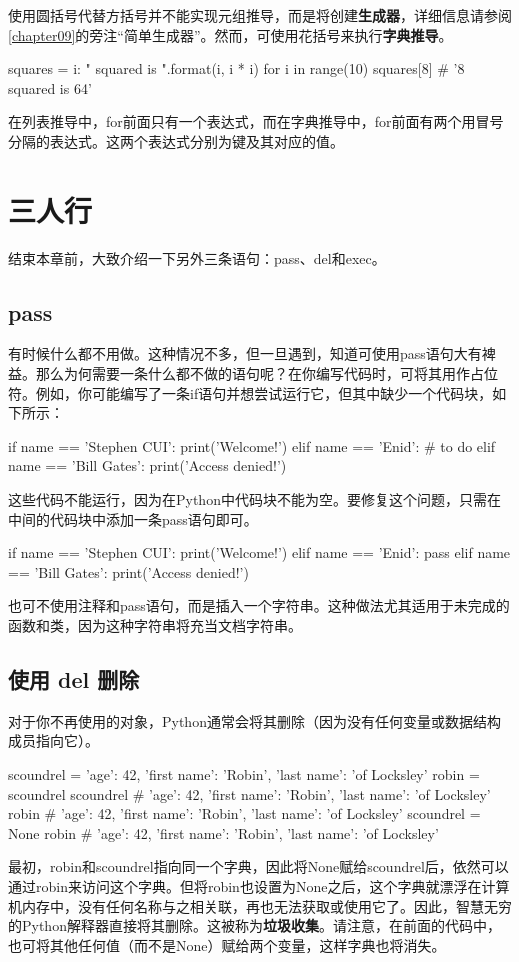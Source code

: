 使用圆括号代替方括号并不能实现元组推导，而是将创建\textbf{生成器}，详细信息请参阅\autoref{chapter09}的旁注“简单生成器”。然而，可使用花括号来执行\textbf{字典推导}。

\begin{pyc}
squares = {i: "{} squared is {}".format(i, i * i) for i in range(10)}
squares[8]  # '8 squared is 64'
\end{pyc}

在列表推导中，for前面只有一个表达式，而在字典推导中，for前面有两个用冒号分隔的表达式。这两个表达式分别为键及其对应的值。
\section{三人行}
结束本章前，大致介绍一下另外三条语句：pass、del和exec。
\subsection{pass}
有时候什么都不用做。这种情况不多，但一旦遇到，知道可使用pass语句大有裨益。那么为何需要一条什么都不做的语句呢？在你编写代码时，可将其用作占位符。例如，你可能编写了一条if语句并想尝试运行它，但其中缺少一个代码块，如下所示：
\begin{pyc}
if name == 'Stephen CUI':
    print('Welcome!')
elif name == 'Enid':
    # to do
elif name == 'Bill Gates':
    print('Access denied!')
\end{pyc}
这些代码不能运行，因为在Python中代码块不能为空。要修复这个问题，只需在中间的代码块中添加一条pass语句即可。
\begin{pyc}
if name == 'Stephen CUI':
    print('Welcome!')
elif name == 'Enid':
    pass
elif name == 'Bill Gates':
    print('Access denied!')
\end{pyc}
\begin{tcolorbox}[title=注意]
    也可不使用注释和pass语句，而是插入一个字符串。这种做法尤其适用于未完成的函数和类，因为这种字符串将充当文档字符串。
\end{tcolorbox}
\subsection{使用 del 删除}
对于你不再使用的对象，Python通常会将其删除（因为没有任何变量或数据结构成员指向它）。
\begin{pyc}
scoundrel = {'age': 42, 'first name': 'Robin', 'last name': 'of Locksley'}
robin = scoundrel
scoundrel  # {'age': 42, 'first name': 'Robin', 'last name': 'of Locksley'}
robin  # {'age': 42, 'first name': 'Robin', 'last name': 'of Locksley'}
scoundrel = None
robin  # {'age': 42, 'first name': 'Robin', 'last name': 'of Locksley'}
\end{pyc}
最初，robin和scoundrel指向同一个字典，因此将None赋给scoundrel后，依然可以通过robin来访问这个字典。但将robin也设置为None之后，这个字典就漂浮在计算机内存中，没有任何名称与之相关联，再也无法获取或使用它了。因此，智慧无穷的Python解释器直接将其删除。这被称为\textbf{垃圾收集}。请注意，在前面的代码中，也可将其他任何值（而不是None）赋给两个变量，这样字典也将消失。

